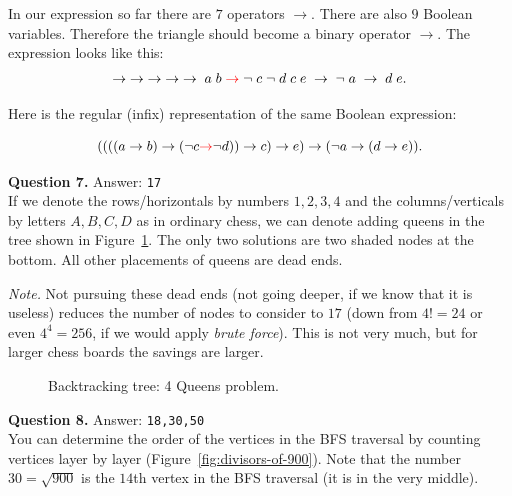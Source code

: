 \documentclass[jou]{apa6}
\begin{document}
In our expression so far there are $7$ operators $\rightarrow$. There are also $9$ Boolean variables. 
Therefore the triangle should become a binary operator $\rightarrow$. 
The expression looks like this: 
$$\rightarrow\;\rightarrow\;\rightarrow\;\rightarrow\;\rightarrow\;a\;b\;\textcolor{red}{\rightarrow}\;\neg\;c\;\neg\;d\;c\;e\;\rightarrow\;\neg\;a\;\rightarrow\;d\;e.$$

Here is the regular (infix) representation of the same Boolean expression:

{\footnotesize
$$((((a \rightarrow b) \rightarrow (\neg c \textcolor{red}{\rightarrow} \neg d)) \rightarrow c) \rightarrow e) 
  \rightarrow (\neg a \rightarrow (d \rightarrow e)).$$
}

\vspace{4pt}
{\bf Question 7.} Answer: {\tt 17}\\

If we denote the rows/horizontals by numbers $1,2,3,4$ and the columns/verticals by letters $A,B,C,D$
as in ordinary chess, we can denote adding queens in the tree shown in Figure~\ref{fig:backtracking-4-queens}. 
The only two solutions are two shaded nodes at the bottom. All other placements of queens are 
dead ends. 

{\em Note.} Not pursuing these dead ends (not going deeper, if we know that it is useless) 
reduces the number of nodes to consider to $17$ (down from $4! = 24$ or even $4^4 = 256$, if we would
apply {\em brute force}). This is not very much, but for larger chess boards the savings are larger. 

\begin{figure}[!htb]
\caption{\label{fig:backtracking-4-queens} Backtracking tree: 4 Queens problem.}
\end{figure}


\vspace{4pt}
{\bf Question 8.} Answer: {\tt 18,30,50} \\

You can determine the order of the vertices in the BFS traversal by counting vertices
layer by layer (Figure~\ref{fig:divisors-of-900}). 
Note that the number $30 = \sqrt{900}$ is the $14$th vertex in the BFS traversal (it is in the very middle). 
\end{document}
